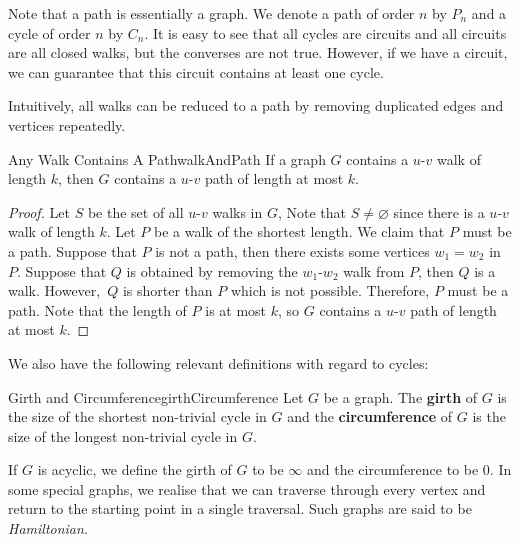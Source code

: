 \documentclass[math]{amznotes}
\theoremstyle{remark}
\begin{document}
Note that a path is essentially a graph. We denote a path of order $n$ by $P_n$ and a cycle of order $n$ by $C_n$. It is easy to see that all cycles are circuits and all circuits are all closed walks, but the converses are not true. However, if we have a circuit, we can guarantee that this circuit contains at least one cycle.

Intuitively, all walks can be reduced to a path by removing duplicated edges and vertices repeatedly.
\begin{probox}{Any Walk Contains A Path}{walkAndPath}
    If a graph $G$ contains a $u$-$v$ walk of length $k$, then $G$ contains a $u$-$v$ path of length at most $k$.
    \tcblower
    \begin{proof}
        Let $S$ be the set of all $u$-$v$ walks in $G$, Note that $S \neq \varnothing$ since there is a $u$-$v$ walk of length $k$. Let $P$ be a walk of the shortest length. We claim that $P$ must be a path. Suppose that $P$ is not a path, then there exists some vertices $w_1 = w_2$ in $P$. Suppose that $Q$ is obtained by removing the $w_1$-$w_2$ walk from $P$, then $Q$ is a walk. However,~$Q$ is shorter than $P$ which is not possible. Therefore, $P$ must be a path. Note that the length of $P$ is at most $k$, so $G$ contains a $u$-$v$ path of length at most $k$.
    \end{proof}
\end{probox}

We also have the following relevant definitions with regard to cycles:
\begin{dfnbox}{Girth and Circumference}{girthCircumference}
    Let $G$ be a graph. The {\color{red} \textbf{girth}} of $G$ is the size of the shortest non-trivial cycle in $G$ and the {\color{red} \textbf{circumference}} of $G$ is the size of the longest non-trivial cycle in $G$.
\end{dfnbox}
If $G$ is acyclic, we define the girth of $G$ to be $\infty$ and the circumference to be $0$. In some special graphs, we realise that we can traverse through every vertex and return to the starting point in a single traversal. Such graphs are said to be \textit{Hamiltonian}.
\end{document}

